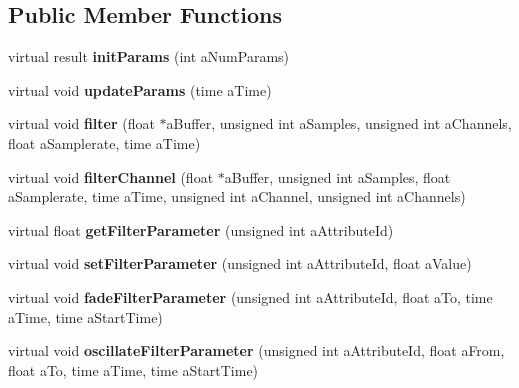 \subsection*{Public Member Functions}
\begin{DoxyCompactItemize}
\item 
\mbox{\label{class_so_loud_1_1_filter_instance_a4d3ded653b15452b6d321e116590be1a}} 
virtual result {\bfseries init\+Params} (int a\+Num\+Params)
\item 
\mbox{\label{class_so_loud_1_1_filter_instance_add61b05cfd7d8bff4c189e2345e726d5}} 
virtual void {\bfseries update\+Params} (time a\+Time)
\item 
\mbox{\label{class_so_loud_1_1_filter_instance_ab41d19f90bbcf4186af153d3f66c1cb1}} 
virtual void {\bfseries filter} (float $\ast$a\+Buffer, unsigned int a\+Samples, unsigned int a\+Channels, float a\+Samplerate, time a\+Time)
\item 
\mbox{\label{class_so_loud_1_1_filter_instance_a00661edcc42a76bc33968b142a75c12c}} 
virtual void {\bfseries filter\+Channel} (float $\ast$a\+Buffer, unsigned int a\+Samples, float a\+Samplerate, time a\+Time, unsigned int a\+Channel, unsigned int a\+Channels)
\item 
\mbox{\label{class_so_loud_1_1_filter_instance_a2be0ea002cdd2a66dfb25fc92350573a}} 
virtual float {\bfseries get\+Filter\+Parameter} (unsigned int a\+Attribute\+Id)
\item 
\mbox{\label{class_so_loud_1_1_filter_instance_acb947880faf6f27b285d95e67eaa6f8a}} 
virtual void {\bfseries set\+Filter\+Parameter} (unsigned int a\+Attribute\+Id, float a\+Value)
\item 
\mbox{\label{class_so_loud_1_1_filter_instance_ae45ac03d9c02644ea139af4488ca87ab}} 
virtual void {\bfseries fade\+Filter\+Parameter} (unsigned int a\+Attribute\+Id, float a\+To, time a\+Time, time a\+Start\+Time)
\item 
\mbox{\label{class_so_loud_1_1_filter_instance_acf4b7ba57c53b5b9d9957e4b9cdd3ed9}} 
virtual void {\bfseries oscillate\+Filter\+Parameter} (unsigned int a\+Attribute\+Id, float a\+From, float a\+To, time a\+Time, time a\+Start\+Time)
\end{DoxyCompactItemize}
